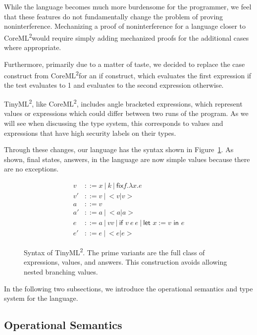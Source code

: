 \documentclass[a4paper,twocolumn]{article}
\newcommand{\langName}[0]{TinyML\textsuperscript{2}}
\newcommand{\origLang}[0]{CoreML\textsuperscript{2}}
\theoremstyle{plain}
\theoremstyle{definition}
\begin{document}
While the language becomes much more burdensome for the programmer, we
feel that these features do not fundamentally change the problem of proving
noninterference.  Mechanizing a proof of noninterference for a
language closer to \origLang would require simply adding mechanized proofs
for the additional cases where appropriate.

Furthermore, primarily due to a matter of taste, we decided to replace the
\textsf{case} construct from \origLang for an \textsf{if} construct, which
evaluates the first expression if the test evaluates to 1 and evaluates to the
second expression otherwise.

\langName, like \origLang, includes angle bracketed expressions, which represent
values or expressions which could differ between two runs of the program.  As we
will see when discussing the type system, this corresponds to values and
expressions that have high security labels on their types.

Through these changes, our language has the syntax shown in
Figure~\ref{fig:syntax}.  As shown, final states, answers, in the language are
now simple values because there are no exceptions.

\begin{figure}[t]
  \begin{align}
    v & ::= x \: | \: k \: | \: \textsf{fix} f . \lambda x . e \tag*{ } \\
    v' & ::= v \: | \: <v | v> \tag{values}\\
    a & ::= v \tag*{ } \\
    a' & ::= a \: | \: <a | a> \tag{answers} \\
    e & ::= a \: | \: v v \: | \: \textsf{if } v \: e \: e \: | \: \textsf{let
    } x := v \textsf{ in } e \tag*{ } \\
    e' & ::= e \: | \: <e | e> \tag{expressions}
  \end{align}
  \caption{Syntax of \langName.  The prime variants are the full class of
  expressions, values, and answers.  This construction avoids allowing nested
  branching values.}
  \label{fig:syntax}
\end{figure}

In the following two subsections, we introduce the operational semantics and
type system for the language.

\subsection{Operational Semantics}
\end{document}

